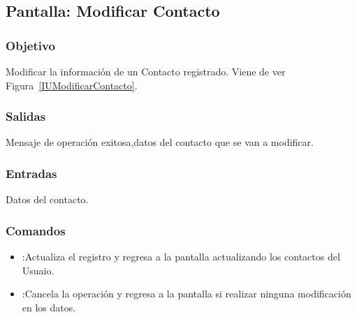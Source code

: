 \subsection{Pantalla: Modificar Contacto}

\subsubsection{Objetivo}
Modificar la información de un Contacto registrado. Viene de ver Figura~\ref{IUModificarContacto}.



\subsubsection{Salidas}
Mensaje de operación exitosa,datos del contacto que se van a modificar.

\subsubsection{Entradas}
Datos del contacto.

\subsubsection{Comandos}
\begin{itemize}
\item {}:Actualiza el registro y regresa a la pantalla  actualizando los contactos del Usuaio.
\item {}:Cancela la operación y regresa a la pantalla  si realizar ninguna modificación en los datos.
\end{itemize}

